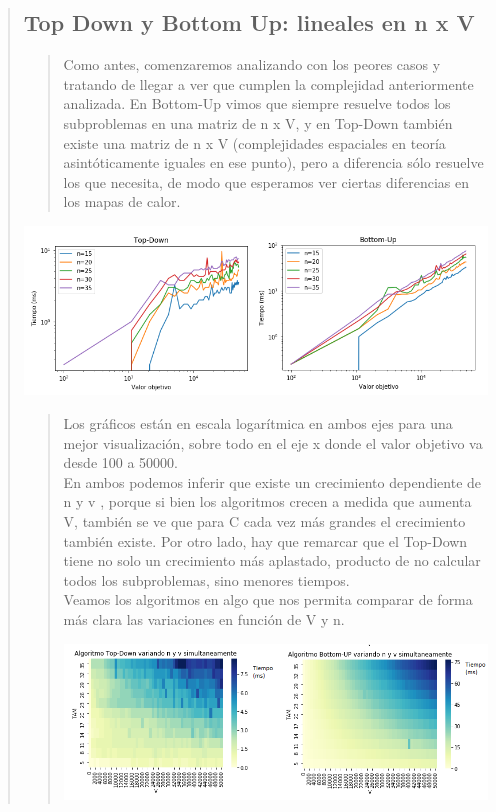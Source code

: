 \documentclass[8pt,a4paper]{article}
\begin{document}
\begin{verse}
\subsection{Top Down y Bottom Up: lineales en n x V}
\begin{verse}
Como antes, comenzaremos analizando con los peores casos y tratando de llegar a ver que cumplen la complejidad anteriormente analizada. En Bottom-Up vimos que siempre resuelve todos los subproblemas en una matriz de n x V, y en Top-Down también existe una matriz de n x V (complejidades espaciales en teoría asintóticamente iguales en ese punto), pero a diferencia sólo resuelve los que necesita, de modo que esperamos ver ciertas diferencias en los mapas de calor.
\end{verse}
\begin{center}
\includegraphics[scale=.9]{tdvsbu_var_n.png}
\end{center}
\begin{verse}
Los gráficos están en escala logarítmica en ambos ejes para una mejor visualización, sobre todo en el eje x donde el valor objetivo va desde 100 a 50000. \\
En ambos podemos inferir que existe un crecimiento dependiente de n y v , porque si bien los algoritmos crecen a medida que aumenta V, también se ve que para C cada vez más grandes el crecimiento también existe. Por otro lado, hay que remarcar que el Top-Down tiene no solo un crecimiento más aplastado, producto de no calcular todos los subproblemas, sino menores tiempos.\\
Veamos los algoritmos en algo que nos permita comparar de forma más clara las variaciones en función de V y n.
\begin{center}
\includegraphics[scale=.8]{tdvsbu_heatmap.png}

\end{center}
\end{verse}
\end{verse}
\end{document}
